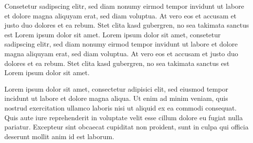 \documentclass[twoside,a4paper]{article}
\begin{document}
Consetetur sadipscing elitr, sed diam nonumy eirmod tempor invidunt ut labore et dolore magna aliquyam erat, sed diam voluptua. At vero eos et accusam et justo duo dolores et ea rebum. Stet clita kasd gubergren, no sea takimata sanctus est Lorem ipsum dolor sit amet. Lorem ipsum dolor sit amet, consetetur sadipscing elitr, sed diam nonumy eirmod tempor invidunt ut labore et dolore magna aliquyam erat, sed diam voluptua. At vero eos et accusam et justo duo dolores et ea rebum. Stet clita kasd gubergren, no sea takimata sanctus est Lorem ipsum dolor sit amet. 

Lorem ipsum dolor sit amet, consectetur adipisici elit, sed eiusmod tempor incidunt ut labore et dolore magna aliqua. Ut enim ad minim veniam, quis nostrud exercitation ullamco laboris nisi ut aliquid ex ea commodi consequat. Quis aute iure reprehenderit in voluptate velit esse cillum dolore eu fugiat nulla pariatur. Excepteur sint obcaecat cupiditat non proident, sunt in culpa qui officia deserunt mollit anim id est laborum.


\end{document}
